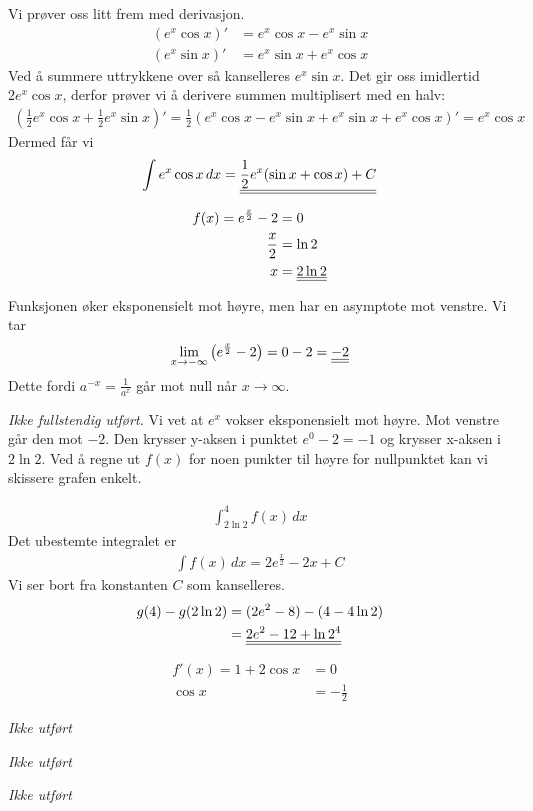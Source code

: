 \documentclass[a4paper,norsk,12pt]{article}
\begin{document}
Vi prøver oss litt frem med derivasjon.
\begin{align*}
  (e^x \cos{x})' &= e^x\cos{x} - e^x\sin{x} \\
  (e^x \sin{x})' &= e^x\sin{x} + e^x\cos{x}
\end{align*}
Ved å summere uttrykkene over så kanselleres $e^x\sin{x}$. Det gir oss
imidlertid $2e^x\cos{x}$, derfor prøver vi å derivere summen multiplisert med
en halv:
\begin{align*}
  \left( \frac{1}{2}e^x \cos{x} +
         \frac{1}{2}e^x \sin{x} \right)' =
    \frac{1}{2} \left( 
        e^x\cos{x}-e^x\sin{x} + e^x\sin{x} + e^x\cos{x}
      \right)' = e^x\cos{x}
\end{align*}
Dermed får vi
\begin{align*}
  \int{e^x\cos{x}} \,dx = 
  {\underline{\underline{ \frac{1}{2}e^x( \sin{x} + \cos{x} ) + C }}}
\end{align*}


\begin{align*}
  f(x) = e^\frac{x}{2} - 2 &= 0 \\
  \frac{x}{2} &= \ln{2} \\
  x &= {\underline{\underline{ 2\ln{2} }}}
\end{align*}

Funksjonen øker eksponensielt mot høyre, men har en asymptote mot venstre. Vi
tar
\begin{align*}
  \lim_{x\to -\infty}{\left( e^\frac{x}{2}-2 \right)} = 0 - 2 = {\underline{\underline{-2}}}
\end{align*}
Dette fordi $a^{-x} = \frac{1}{a^x}$ går mot null når $x\to\infty$.

\textit{Ikke fullstendig utført.}
Vi vet at $e^x$ vokser eksponensielt mot høyre. Mot venstre går den mot $-2$.
Den krysser y-aksen i punktet $e^0-2 = -1$ og krysser x-aksen i $2\ln{2}$. Ved
å regne ut $f(x)$ for noen punkter til høyre for nullpunktet kan vi skissere
grafen enkelt.

\begin{align*}
  \int_{2\ln{2}}^{4}f(x)\,dx
\end{align*}
Det ubestemte integralet er
\begin{align*}
  \int f(x) \,dx = 2e^\frac{x}{2} - 2x + C
\end{align*}
Vi ser bort fra konstanten $C$ som kanselleres.
\begin{align*}
  g(4) - g(2\ln{2}) & = (2e^2-8) - (4 - 4\ln{2}) \\
                    &= {\underline{\underline{2e^2 - 12 + \ln{2^4}}}}
\end{align*}

\begin{align*}
  f'(x) = 1 + 2\cos{x} & = 0\\
  \cos{x} & = -\frac{1}{2}
\end{align*}

\textit{Ikke utført}

\textit{Ikke utført}

\textit{Ikke utført}
\end{document}
